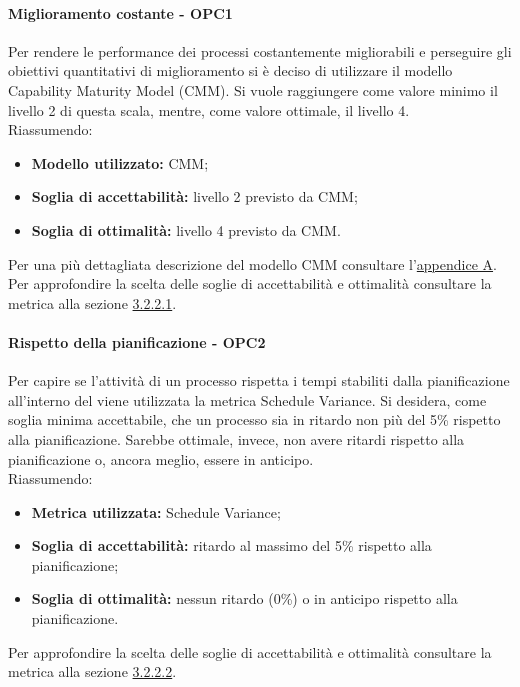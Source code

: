 \documentclass[PianoDiQualifica.tex]{subfiles}
\begin{document}
			\paragraph{Miglioramento costante - OPC1}
			Per rendere le performance dei processi costantemente migliorabili e perseguire gli obiettivi quantitativi di miglioramento si è deciso di utilizzare il modello Capability Maturity Model (CMM).
			Si vuole raggiungere come valore minimo il livello 2 di questa scala, mentre, come valore ottimale, il livello 4. \\
			Riassumendo:
			\begin{itemize}
			\item \textbf{Modello utilizzato:} CMM;
			\item \textbf{Soglia di accettabilità:} livello 2 previsto da CMM;
			\item \textbf{Soglia di ottimalità:} livello 4 previsto da CMM.
			\end{itemize}
			Per una più dettagliata descrizione del modello CMM consultare l'\hyperlink{CMM_label}{appendice A}. \\
			Per approfondire la scelta delle soglie di accettabilità e ottimalità consultare la metrica alla sezione \hyperlink{CMM_m}{3.2.2.1}.

			\paragraph{Rispetto della pianificazione - OPC2}
			Per capire se l'attività di un processo rispetta i tempi stabiliti dalla pianificazione all'interno del \PPdocRR{} viene utilizzata la metrica Schedule Variance.
			Si desidera, come soglia minima accettabile, che un processo sia in ritardo non più del 5\% rispetto alla pianificazione. Sarebbe ottimale, invece, non avere ritardi
			rispetto alla pianificazione o, ancora meglio, essere in anticipo.\\
			Riassumendo:
			\begin{itemize}
			\item \textbf{Metrica utilizzata:} Schedule Variance;
			\item \textbf{Soglia di accettabilità:} ritardo al massimo del 5\% rispetto alla pianificazione;
			\item \textbf{Soglia di ottimalità:} nessun ritardo (0\%) o in anticipo rispetto alla pianificazione.
			\end{itemize}
			Per approfondire la scelta delle soglie di accettabilità e ottimalità consultare la metrica alla sezione \hyperlink{Schedule_m}{3.2.2.2}.
\end{document}
